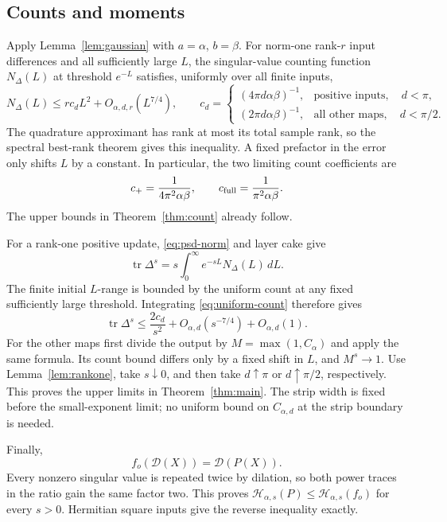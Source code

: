 \documentclass[11pt]{article}
\numberwithin{equation}{section}
\newcommand{\tr}{\operatorname{tr}}
\newcommand{\cH}{\mathcal H}
\newcommand{\cD}{\mathcal D}
\begin{document}
\subsection*{Counts and moments}
Apply Lemma~\ref{lem:gaussian} with $a=\alpha$, $b=\beta$.
For norm-one rank-$r$ input differences and all sufficiently large $L$,
the singular-value counting function $N_\Delta(L)$ at threshold $e^{-L}$
satisfies, uniformly over all finite inputs,
\begin{equation}\label{eq:uniform-count}
 N_\Delta(L)\le r c_d L^2+O_{\alpha,d,r}(L^{7/4}),\qquad
 c_d=
 \begin{cases}
 (4\pi d\alpha\beta)^{-1},&\text{positive inputs},\quad d<\pi,\\
 (2\pi d\alpha\beta)^{-1},&\text{all other maps},\quad d<\pi/2.
 \end{cases}
\end{equation}
The quadrature approximant has rank at most its total sample rank,
so the spectral best-rank theorem gives this inequality. A fixed
prefactor in the error only shifts $L$ by a constant. In particular,
the two limiting count coefficients are
\begin{equation}\label{eq:c-values}
 c_+=\frac{1}{4\pi^2\alpha\beta},\qquad
 c_{\rm full}=\frac{1}{\pi^2\alpha\beta}.
\end{equation}
The upper bounds in Theorem~\ref{thm:count} already follow.

For a rank-one positive update, \eqref{eq:psd-norm} and layer cake give
\begin{equation}\label{eq:layercake}
 \tr\Delta^s
       =s\int_0^\infty e^{-sL}N_\Delta(L)\,dL.
\end{equation}
The finite initial $L$-range is bounded by the uniform count at any
fixed sufficiently large threshold. Integrating
\eqref{eq:uniform-count} therefore gives
\[
 \tr\Delta^s\le\frac{2c_d}{s^2}
       +O_{\alpha,d}(s^{-7/4})+O_{\alpha,d}(1).
\]
For the other maps first divide the output by
$M=\max(1,C_\alpha)$ and apply the same formula. Its count bound differs
only by a fixed shift in $L$, and $M^s\to1$.
Use Lemma~\ref{lem:rankone}, take $s\downarrow0$, and then take
$d\uparrow\pi$ or $d\uparrow\pi/2$, respectively. This proves the upper
limits in Theorem~\ref{thm:main}. The strip width is fixed before the
small-exponent limit; no uniform bound on $C_{\alpha,d}$ at the strip
boundary is needed.

Finally,
\[
 f_o(\cD(X))=\cD(P(X)).
\]
Every nonzero singular value is repeated twice by dilation, so both
power traces in the ratio gain the same factor two. This proves
$\cH_{\alpha,s}(P)\le\cH_{\alpha,s}(f_o)$ for every $s>0$.
Hermitian square inputs give the reverse inequality exactly.
\end{document}
